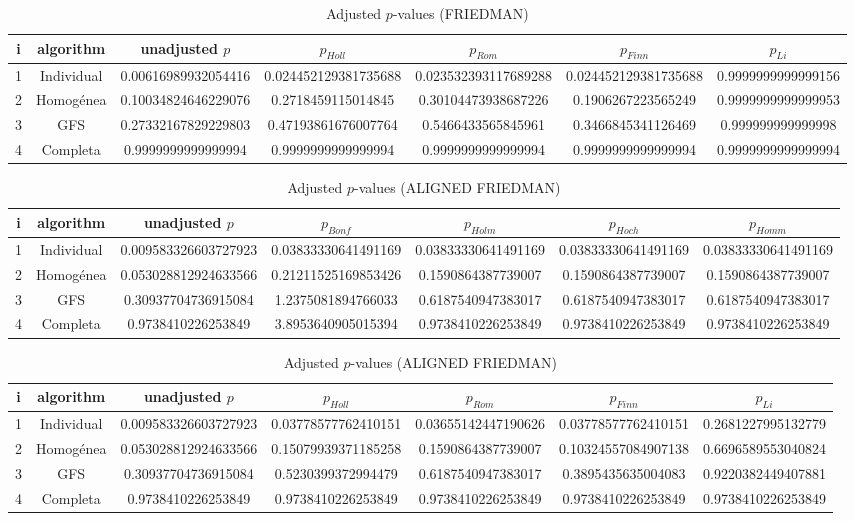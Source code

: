 \documentclass[a4paper,10pt]{article}
\begin{document}
\begin{landscape}
\begin{table}[!htp]
\centering\scriptsize
\caption{Adjusted $p$-values (FRIEDMAN)}
\begin{tabular}{ccccccc}
i&algorithm&unadjusted $p$&$p_{Holl}$&$p_{Rom}$&$p_{Finn}$&$p_{Li}$\\
\hline
1&Individual&0.00616989932054416&0.024452129381735688&0.023532393117689288&0.024452129381735688&0.9999999999999156\\
2&Homogénea&0.10034824646229076&0.2718459115014845&0.30104473938687226&0.1906267223565249&0.9999999999999953\\
3&GFS&0.27332167829229803&0.47193861676007764&0.5466433565845961&0.3466845341126469&0.999999999999998\\
4&Completa&0.9999999999999994&0.9999999999999994&0.9999999999999994&0.9999999999999994&0.9999999999999994\\
\hline
\end{tabular}
\end{table}


\newpage

\begin{table}[!htp]
\centering\scriptsize
\caption{Adjusted $p$-values (ALIGNED FRIEDMAN)}
\begin{tabular}{ccccccc}
i&algorithm&unadjusted $p$&$p_{Bonf}$&$p_{Holm}$&$p_{Hoch}$&$p_{Homm}$\\
\hline
1&Individual&0.009583326603727923&0.03833330641491169&0.03833330641491169&0.03833330641491169&0.03833330641491169\\
2&Homogénea&0.053028812924633566&0.21211525169853426&0.1590864387739007&0.1590864387739007&0.1590864387739007\\
3&GFS&0.30937704736915084&1.2375081894766033&0.6187540947383017&0.6187540947383017&0.6187540947383017\\
4&Completa&0.9738410226253849&3.8953640905015394&0.9738410226253849&0.9738410226253849&0.9738410226253849\\
\hline
\end{tabular}
\end{table}

\begin{table}[!htp]
\centering\scriptsize
\caption{Adjusted $p$-values (ALIGNED FRIEDMAN)}
\begin{tabular}{ccccccc}
i&algorithm&unadjusted $p$&$p_{Holl}$&$p_{Rom}$&$p_{Finn}$&$p_{Li}$\\
\hline
1&Individual&0.009583326603727923&0.03778577762410151&0.03655142447190626&0.03778577762410151&0.2681227995132779\\
2&Homogénea&0.053028812924633566&0.15079939371185258&0.1590864387739007&0.10324557084907138&0.6696589553040824\\
3&GFS&0.30937704736915084&0.5230399372994479&0.6187540947383017&0.3895435635004083&0.9220382449407881\\
4&Completa&0.9738410226253849&0.9738410226253849&0.9738410226253849&0.9738410226253849&0.9738410226253849\\
\hline
\end{tabular}
\end{table}



\end{landscape}
\end{document}
